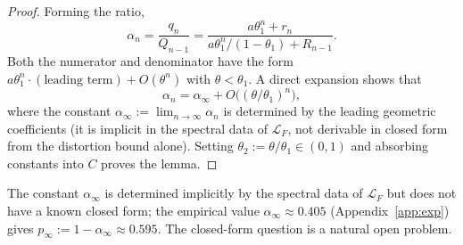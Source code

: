 \begin{proof}
Forming the ratio,
\[
    \alpha_n = \frac{q_n}{Q_{n-1}}
    = \frac{a \theta_1^n + r_n}{a \theta_1^n / (1 - \theta_1) + R_{n-1}}.
\]
Both the numerator and denominator have the form
$a \theta_1^n \cdot (\text{leading term}) + O(\theta^n)$ with
$\theta < \theta_1$. A direct expansion shows that
\[
    \alpha_n = \alpha_\infty + O\bigl((\theta / \theta_1)^n\bigr),
\]
where the constant $\alpha_\infty := \lim_{n \to \infty} \alpha_n$ is
determined by the leading geometric coefficients (it is implicit in the
spectral data of $\mathcal{L}_F$, not derivable in closed form from the
distortion bound alone). Setting $\theta_2 := \theta / \theta_1 \in (0, 1)$
and absorbing constants into $C$ proves the lemma.
\end{proof}

\begin{remark}
The constant $\alpha_\infty$ is determined implicitly by the spectral
data of $\mathcal{L}_F$ but does not have a known closed form; the
empirical value $\alpha_\infty \approx 0.405$ (Appendix~\ref{app:exp})
gives $p_\infty := 1 - \alpha_\infty \approx 0.595$. The closed-form
question is a natural open problem.
\end{remark}
